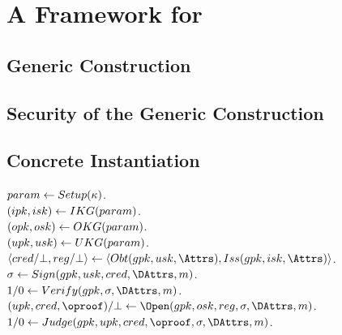 \section{A Framework for \GSAC}
\label{sec:construction}

\subsection{Generic Construction}
\label{ssec:framework}

\subsection{Security of the Generic Construction}
\label{ssec:proofs}

\subsection{Concrete Instantiation}
\label{ssec:instantiation}

\begin{description}
\item[$param \gets Setup(\kappa)$.]  
\item[$(ipk,isk) \gets IKG(param)$.]
\item[$(opk,osk) \gets OKG(param)$.]
\item[$(upk,usk) \gets UKG(param)$.]
\item[$\langle \cred/\bot,\utrans/\bot \rangle \gets
  \langle \Obtain(\gpk,\usk,\Attrs),\Issue(\gpk,\isk,\Attrs) \rangle$.]
\item[$\sig \gets \Sign(\gpk,\usk,\cred,\DAttrs,\msg)$.] 
\item[$1/0 \gets \Verify(\gpk,\sig,\DAttrs,\msg)$.]
\item[$(\upk,\cred,\oproof)/\bot \gets
  \Open(\gpk,\osk,\utrans,\sig,\DAttrs,\msg)$.]
\item[$1/0 \gets \Judge(\gpk,\upk,\cred,\oproof,\sig,\DAttrs,\msg)$.]
\end{description}
  
